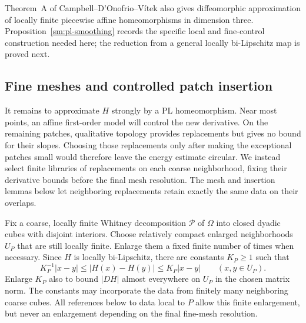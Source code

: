 \begin{remark}
Theorem~A of Campbell--D'Onofrio--V\'itek
\cite{CampbellDOnofrioVitek2026} also gives diffeomorphic
approximation of locally finite piecewise affine homeomorphisms
in dimension three.  Proposition~\ref{sm:pl-smoothing} records the
specific local and fine-control construction needed here; the
reduction from a general locally bi-Lipschitz map is proved next.
\end{remark}

\subsection{Fine meshes and controlled patch insertion}

It remains to approximate $H$ strongly by a PL homeomorphism.
Near most points, an affine first-order model will control the new
derivative. On the remaining patches, qualitative topology provides
replacements but gives no bound for their slopes. Choosing those
replacements only after making the exceptional patches small would
therefore leave the energy estimate circular. We instead select finite
libraries of replacements on each coarse neighborhood, fixing their
derivative bounds before the final mesh resolution. The mesh and
insertion lemmas below let neighboring replacements retain exactly
the same data on their overlaps.

Fix a coarse, locally finite Whitney decomposition $\mathcal P$ of
$\Omega$ into closed dyadic cubes with disjoint interiors.  Choose
relatively compact enlarged neighborhoods $U_P$ that are still locally
finite.  Enlarge them a fixed finite number of times when necessary.
Since $H$ is locally bi-Lipschitz, there are constants $K_P\ge1$ such
that
\begin{equation}
 \label{sm:coarse-bilip}
 K_P^{-1}|x-y|\le |H(x)-H(y)|\le K_P|x-y|
 \qquad(x,y\in U_P).
\end{equation}
Enlarge $K_P$ also to bound $|DH|$ almost everywhere on $U_P$ in the
chosen matrix norm.  The constants may incorporate the data from finitely many neighboring
coarse cubes.  All references below to data local to $P$ allow this
finite enlargement, but never an enlargement depending on the final
fine-mesh resolution.


